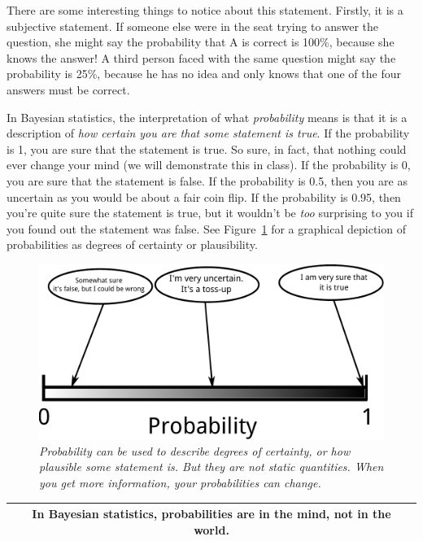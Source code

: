 There are some interesting
things to notice about this statement. Firstly, it is a subjective statement.
If someone else were in the seat trying to answer the question, she might say
the probability that A is correct is 100\%, because she knows the answer!
A third person faced with the same question might say the probability is 25\%,
because he has no idea and only knows that one of the four answers
must be correct.

In Bayesian statistics, the interpretation of what {\it probability} means is
that it is a description of {\it how certain you are that some statement is
true}.
If the probability is 1, you are sure that the statement is true. So sure, in
fact, that nothing could ever change your mind (we will demonstrate this in class).
If the probability is 0, you
are sure that the statement is false. If the probability is 0.5, then you
are as uncertain as you would be about a fair coin flip. If the probability is
0.95, then you're quite sure the statement is true, but it wouldn't be {\it too}
surprising to you if you found out the statement was false. See
Figure~\ref{fig:probability_scale} for a graphical depiction of probabilities
as degrees of certainty or plausibility.

\begin{figure}
\begin{center}
\includegraphics[scale=0.6]{Figures/probability_scale.pdf}
\caption{\it Probability can be used to describe degrees of certainty, or
how plausible some statement is. But they are not static quantities. When
you get more information, your probabilities can change.
\label{fig:probability_scale}}
\end{center}
\end{figure}

\begin{center}
\begin{tabular}{|c|}
\hline
{\bf In Bayesian statistics, probabilities are in the mind, not in the world.}\\
\hline
\end{tabular}
\end{center}

